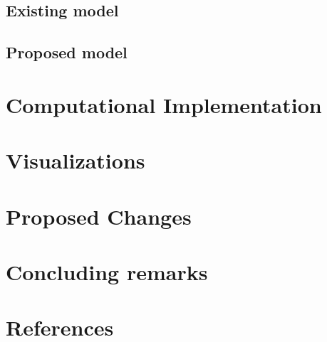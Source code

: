 \documentclass[12pt]{article}
\begin{document}
\subsection{Existing model}
\subsection{Proposed model}
\section{Computational Implementation}
\section{Visualizations}
\section{Proposed Changes}
\section{Concluding remarks}
\section{References}
\end{document}
